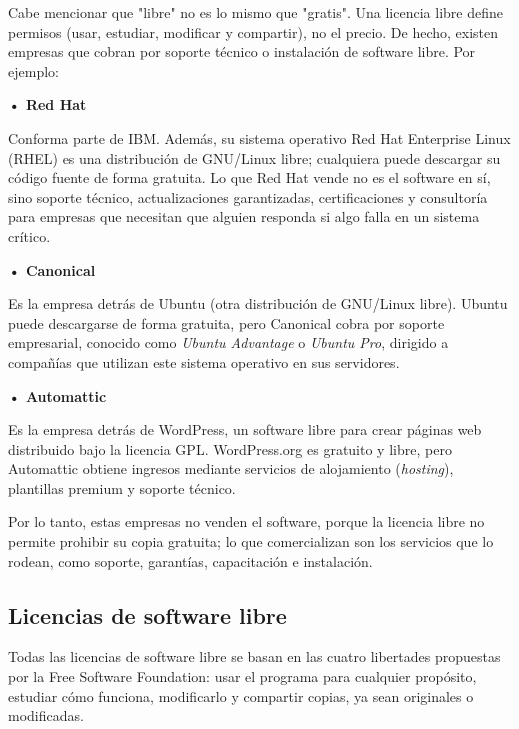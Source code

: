 \documentclass[12pt]{article}
\begin{document}
    Cabe mencionar que "libre" no es lo mismo que "gratis". Una licencia libre define permisos (usar, estudiar, modificar y compartir), no el precio. De hecho, existen empresas que cobran por soporte técnico o instalación de software libre. Por ejemplo:

    \medskip

    \hspace*{\parindent}\textbf{• Red Hat}

    Conforma parte de IBM. Además, su sistema operativo Red Hat Enterprise Linux (RHEL) es una distribución de GNU/Linux libre; cualquiera puede descargar su código fuente de forma gratuita. Lo que Red Hat vende no es el software en sí, sino soporte técnico, actualizaciones garantizadas, certificaciones y consultoría para empresas que necesitan que alguien responda si algo falla en un sistema crítico.

    \medskip

    \hspace*{\parindent}\textbf{• Canonical}

    Es la empresa detrás de Ubuntu (otra distribución de GNU/Linux libre). Ubuntu puede descargarse de forma gratuita, pero Canonical cobra por soporte empresarial, conocido como \textit{Ubuntu Advantage} o \textit{Ubuntu Pro}, dirigido a compañías que utilizan este sistema operativo en sus servidores.

    \medskip

    \hspace*{\parindent}\textbf{• Automattic}

    Es la empresa detrás de WordPress, un software libre para crear páginas web distribuido bajo la licencia GPL. WordPress.org es gratuito y libre, pero Automattic obtiene ingresos mediante servicios de alojamiento (\textit{hosting}), plantillas premium y soporte técnico.

    Por lo tanto, estas empresas no venden el software, porque la licencia libre no permite prohibir su copia gratuita; lo que comercializan son los servicios que lo rodean, como soporte, garantías, capacitación e instalación.
	
	\subsection{Licencias de software libre}

    Todas las licencias de software libre se basan en las cuatro libertades propuestas por la Free Software Foundation: usar el programa para cualquier propósito, estudiar cómo funciona, modificarlo y compartir copias, ya sean originales o modificadas.
\end{document}
